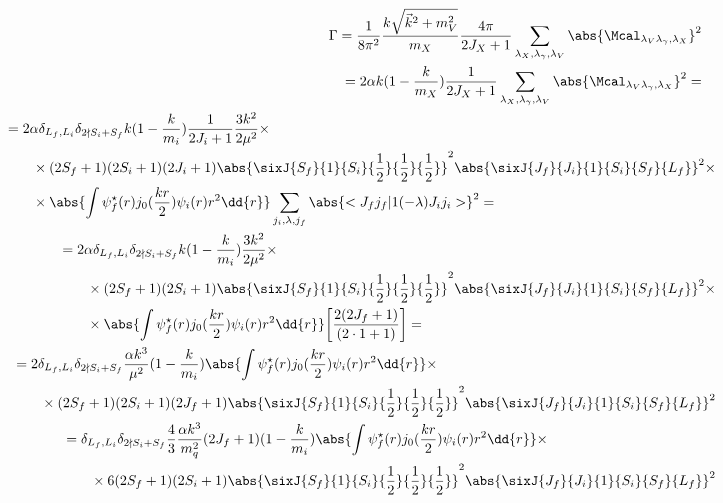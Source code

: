 \begin{align}
    \begin{split}
        &\Gamma = \frac{1}{8 \pi^2} \frac{k \sqrt{\vec{k}^2 + m_V^2}}{m_X} \frac{4\pi}{2J_X + 1} \sum_{\lambda_X, \lambda_\gamma, \lambda_V} \abs{\Mcal_{\lambda_V \lambda_\gamma, \lambda_X}}^2
    \end{split}\\
    \begin{split}
        &= 2 \alpha k (1 - \frac{k}{m_X}) \frac{1}{2J_X + 1} \sum_{\lambda_X, \lambda_\gamma, \lambda_V} \abs{\Mcal_{\lambda_V \lambda_\gamma, \lambda_X}}^2 =
    \end{split}\\
    \begin{split}
        &= 2 \alpha \delta_{L_f, L_i} \delta_{2 \nmid S_i + S_f} k (1 - \frac{k}{m_i}) \frac{1}{2J_i + 1} \frac{3 k^2}{2 \mu^2} \times\\
        &\qquad\times (2S_f + 1) (2S_i+1) (2J_i + 1) \abs{\sixJ{S_f}{1}{S_i}{\frac{1}{2}}{\frac{1}{2}}{\frac{1}{2}}}^2 \abs{\sixJ{J_f}{J_i}{1}{S_i}{S_f}{L_f}}^2 \times \\
        &\qquad\times \abs{\int \psi_f^\star(r) j_0(\frac{kr}{2}) \psi_i(r) r^2 \dd{r} } \sum_{j_i, \lambda, j_f} \abs{<J_f j_f | 1 (-\lambda) J_i j_i>}^2 =
    \end{split}\\
    \begin{split}
        &= 2 \alpha \delta_{L_f, L_i} \delta_{2 \nmid S_i + S_f} k (1 - \frac{k}{m_i}) \frac{3 k^2}{2 \mu^2} \times\\
        &\qquad\times (2S_f + 1) (2S_i+1) \abs{\sixJ{S_f}{1}{S_i}{\frac{1}{2}}{\frac{1}{2}}{\frac{1}{2}}}^2 \abs{\sixJ{J_f}{J_i}{1}{S_i}{S_f}{L_f}}^2 \times \\
        &\qquad\times \abs{\int \psi_f^\star(r) j_0(\frac{kr}{2}) \psi_i(r) r^2 \dd{r} } \bigg[ \frac{2 (2J_f+1)}{(2\cdot1 + 1)} \bigg] =
    \end{split}\\
    \begin{split}
        &= 2 \delta_{L_f, L_i} \delta_{2 \nmid S_i + S_f} \frac{\alpha k^3}{\mu^2} (1 - \frac{k}{m_i}) \abs{\int \psi_f^\star(r) j_0(\frac{kr}{2}) \psi_i(r) r^2 \dd{r} } \times\\
        &\qquad\times (2S_f + 1) (2S_i+1) (2J_f+1) \abs{\sixJ{S_f}{1}{S_i}{\frac{1}{2}}{\frac{1}{2}}{\frac{1}{2}}}^2 \abs{\sixJ{J_f}{J_i}{1}{S_i}{S_f}{L_f}}^2
    \end{split}\\
    \begin{split}
        &= \delta_{L_f, L_i} \delta_{2 \nmid S_i + S_f} \frac{4}{3} \frac{\alpha k^3}{m_q^2} (2J_f+1) (1 - \frac{k}{m_i}) \abs{\int \psi_f^\star(r) j_0(\frac{kr}{2}) \psi_i(r) r^2 \dd{r} } \times\\
        &\qquad\times 6 (2S_f + 1) (2S_i+1) \abs{\sixJ{S_f}{1}{S_i}{\frac{1}{2}}{\frac{1}{2}}{\frac{1}{2}}}^2 \abs{\sixJ{J_f}{J_i}{1}{S_i}{S_f}{L_f}}^2
    \end{split}
\end{align}
